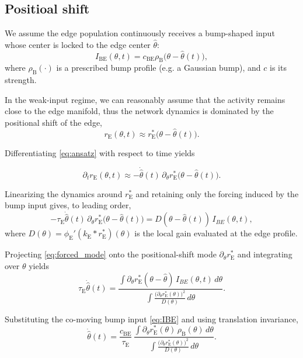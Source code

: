 \documentclass{article}
\newcommand{\rE}{r_{\text{E}}}
\newcommand{\rhoB}{\rho_{\text{B}}}
\newcommand{\tauE}{\tau_{\text{E}}}
\newcommand{\kE}{k_{\text{E}}}
\newcommand{\phiE}{\phi_{\text{E}}}
\newcommand{\IBE}{I_{\text{BE}}}
\newcommand{\cBE}{c_{\text{BE}}}
\begin{document}
\subsection{Positioal shift}
We assume the edge population continuously receives a bump-shaped input whose center is locked to the edge center $\hat{\theta}$:
\begin{equation}
\IBE(\theta,t)=\cBE \rhoB\!\big(\theta-\hat{\theta}(t)\big),
\label{eq:IBE}
\end{equation}
where $\rhoB(\cdot)$ is a prescribed bump profile (e.g. a Gaussian bump), and $c$ is its strength.

In the weak-input regime, we can reasonably assume that the activity remains close to the edge manifold, thus the network dynamics is dominated by the positional shift of the edge,
\begin{equation}
\rE(\theta,t)\approx \rE^*\!\big(\theta-\hat{\theta}(t)\big).
\label{eq:ansatz}
\end{equation}

Differentiating \eqref{eq:ansatz} with respect to time yields




\begin{equation}
\partial_t \rE(\theta,t)
\approx
- \dot{\hat{\theta}}(t)\,
\partial_\theta \rE^*\!\big(\theta-\hat{\theta}(t)\big).
\label{eq:rt_shift}
\end{equation}

Linearizing the dynamics around $\rE^*$ and retaining only the forcing induced by the bump input gives, to leading order,
\begin{equation}
- \tauE \dot{\hat{\theta}}(t)\,
\partial_\theta \rE^*\!\big(\theta-\hat{\theta}(t)\big)
=
D(\theta-\hat{\theta}(t))\, I_{BE}(\theta,t),
\label{eq:forced_mode}
\end{equation}
where $D(\theta)=\phiE'(\kE * \rE^*)(\theta)$ is the local gain evaluated at the edge profile.

Projecting \eqref{eq:forced_mode} onto the positional-shift mode
$\partial_\theta \rE^*$ and integrating over $\theta$ yields
\begin{equation}
\tauE \dot{\hat{\theta}}(t)
=
\frac{
\displaystyle
\int
\partial_\theta \rE^*(\theta-\hat{\theta})
\, I_{BE}(\theta,t)\, d\theta
}{
\displaystyle
\int
\frac{
\big(\partial_\theta \rE^*(\theta)\big)^2
}{
D(\theta)
}\, d\theta
}.
\label{eq:theta_general}
\end{equation}

Substituting the co-moving bump input \eqref{eq:IBE} and using translation invariance,
\begin{equation}
\boxed{
\dot{\hat{\theta}}(t)
=
\frac{\cBE}{\tauE}
\,
\frac{
\displaystyle
\int
\partial_\theta \rE^*(\theta)\,
\rhoB(\theta)\, d\theta
}{
\displaystyle
\int
\frac{
\big(\partial_\theta \rE^*(\theta)\big)^2
}{
D(\theta)
}\, d\theta
}.
}
\label{eq:speed_c_relation}
\end{equation}
\end{document}
